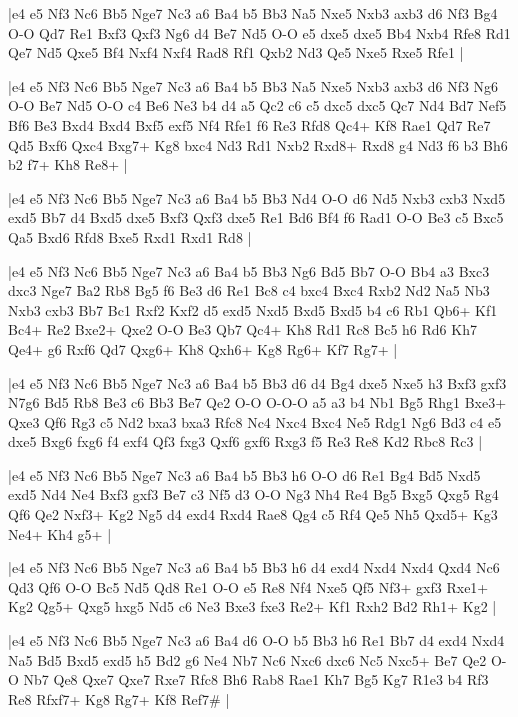 \whitename{}
\blackname{}
\makegametitle
|e4 e5 Nf3 Nc6 Bb5 Nge7 Nc3 a6 Ba4 b5 Bb3 Na5 Nxe5 Nxb3 axb3 d6 Nf3 Bg4 O-O Qd7 Re1 Bxf3 Qxf3 Ng6 d4 Be7 Nd5 O-O e5 dxe5 dxe5 Bb4 Nxb4 Rfe8 Rd1 Qe7 Nd5 Qxe5 Bf4 Nxf4 Nxf4 Rad8 Rf1 Qxb2 Nd3 Qe5 Nxe5 Rxe5 Rfe1  |

\whitename{}
\blackname{}
\makegametitle
|e4 e5 Nf3 Nc6 Bb5 Nge7 Nc3 a6 Ba4 b5 Bb3 Na5 Nxe5 Nxb3 axb3 d6 Nf3 Ng6 O-O Be7 Nd5 O-O c4 Be6 Ne3 b4 d4 a5 Qc2 c6 c5 dxc5 dxc5 Qc7 Nd4 Bd7 Nef5 Bf6 Be3 Bxd4 Bxd4 Bxf5 exf5 Nf4 Rfe1 f6 Re3 Rfd8 Qc4+ Kf8 Rae1 Qd7 Re7 Qd5 Bxf6 Qxc4 Bxg7+ Kg8 bxc4 Nd3 Rd1 Nxb2 Rxd8+ Rxd8 g4 Nd3 f6 b3 Bh6 b2 f7+ Kh8 Re8+  |

\whitename{}
\blackname{}
\makegametitle
|e4 e5 Nf3 Nc6 Bb5 Nge7 Nc3 a6 Ba4 b5 Bb3 Nd4 O-O d6 Nd5 Nxb3 cxb3 Nxd5 exd5 Bb7 d4 Bxd5 dxe5 Bxf3 Qxf3 dxe5 Re1 Bd6 Bf4 f6 Rad1 O-O Be3 c5 Bxc5 Qa5 Bxd6 Rfd8 Bxe5 Rxd1 Rxd1 Rd8  |

\whitename{}
\blackname{}
\makegametitle
|e4 e5 Nf3 Nc6 Bb5 Nge7 Nc3 a6 Ba4 b5 Bb3 Ng6 Bd5 Bb7 O-O Bb4 a3 Bxc3 dxc3 Nge7 Ba2 Rb8 Bg5 f6 Be3 d6 Re1 Bc8 c4 bxc4 Bxc4 Rxb2 Nd2 Na5 Nb3 Nxb3 cxb3 Bb7 Bc1 Rxf2 Kxf2 d5 exd5 Nxd5 Bxd5 Bxd5 b4 c6 Rb1 Qb6+ Kf1 Bc4+ Re2 Bxe2+ Qxe2 O-O Be3 Qb7 Qc4+ Kh8 Rd1 Rc8 Bc5 h6 Rd6 Kh7 Qe4+ g6 Rxf6 Qd7 Qxg6+ Kh8 Qxh6+ Kg8 Rg6+ Kf7 Rg7+  |

\whitename{}
\blackname{}
\makegametitle
|e4 e5 Nf3 Nc6 Bb5 Nge7 Nc3 a6 Ba4 b5 Bb3 d6 d4 Bg4 dxe5 Nxe5 h3 Bxf3 gxf3 N7g6 Bd5 Rb8 Be3 c6 Bb3 Be7 Qe2 O-O O-O-O a5 a3 b4 Nb1 Bg5 Rhg1 Bxe3+ Qxe3 Qf6 Rg3 c5 Nd2 bxa3 bxa3 Rfc8 Nc4 Nxc4 Bxc4 Ne5 Rdg1 Ng6 Bd3 c4 e5 dxe5 Bxg6 fxg6 f4 exf4 Qf3 fxg3 Qxf6 gxf6 Rxg3 f5 Re3 Re8 Kd2 Rbc8 Rc3  |

\whitename{}
\blackname{}
\makegametitle
|e4 e5 Nf3 Nc6 Bb5 Nge7 Nc3 a6 Ba4 b5 Bb3 h6 O-O d6 Re1 Bg4 Bd5 Nxd5 exd5 Nd4 Ne4 Bxf3 gxf3 Be7 c3 Nf5 d3 O-O Ng3 Nh4 Re4 Bg5 Bxg5 Qxg5 Rg4 Qf6 Qe2 Nxf3+ Kg2 Ng5 d4 exd4 Rxd4 Rae8 Qg4 c5 Rf4 Qe5 Nh5 Qxd5+ Kg3 Ne4+ Kh4 g5+  |

\whitename{}
\blackname{}
\makegametitle
|e4 e5 Nf3 Nc6 Bb5 Nge7 Nc3 a6 Ba4 b5 Bb3 h6 d4 exd4 Nxd4 Nxd4 Qxd4 Nc6 Qd3 Qf6 O-O Bc5 Nd5 Qd8 Re1 O-O e5 Re8 Nf4 Nxe5 Qf5 Nf3+ gxf3 Rxe1+ Kg2 Qg5+ Qxg5 hxg5 Nd5 c6 Ne3 Bxe3 fxe3 Re2+ Kf1 Rxh2 Bd2 Rh1+ Kg2  |

\whitename{}
\blackname{}
\makegametitle
|e4 e5 Nf3 Nc6 Bb5 Nge7 Nc3 a6 Ba4 d6 O-O b5 Bb3 h6 Re1 Bb7 d4 exd4 Nxd4 Na5 Bd5 Bxd5 exd5 h5 Bd2 g6 Ne4 Nb7 Nc6 Nxc6 dxc6 Nc5 Nxc5+ Be7 Qe2 O-O Nb7 Qe8 Qxe7 Qxe7 Rxe7 Rfc8 Bh6 Rab8 Rae1 Kh7 Bg5 Kg7 R1e3 b4 Rf3 Re8 Rfxf7+ Kg8 Rg7+ Kf8 Ref7\#  |

